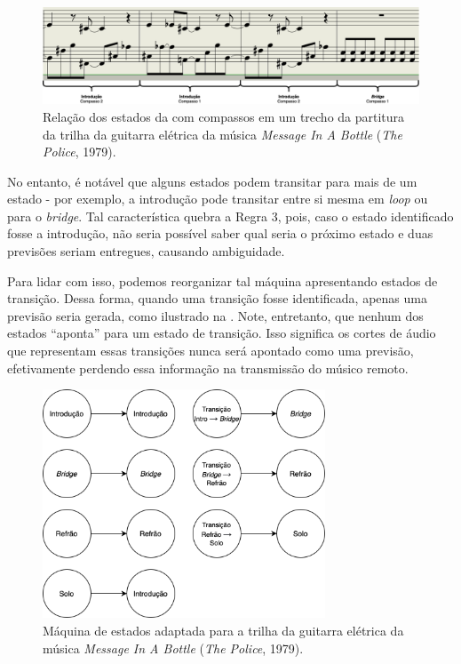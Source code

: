 \begin{figure}[htbp]
    \centering
    \includegraphics[width=1\textwidth]{images/dtw-real division.png}
    \caption{Relação dos estados da  com compassos em um trecho da partitura da trilha da guitarra elétrica da música \textit{Message In A Bottle} (\textit{The Police}, 1979).}
    \label{fig:miab_sheet_music}
\end{figure}

No entanto, é notável que alguns estados podem transitar para mais de um estado - por exemplo, a introdução pode transitar entre si mesma em \textit{loop} ou para o \textit{bridge}. Tal característica quebra a Regra 3, pois, caso o estado identificado fosse a introdução, não seria possível saber qual seria o próximo estado e duas previsões seriam entregues, causando ambiguidade.

Para lidar com isso, podemos reorganizar tal máquina apresentando estados de transição. Dessa forma, quando uma transição fosse identificada, apenas uma previsão seria gerada, como ilustrado na . Note, entretanto, que nenhum dos estados ``aponta'' para um estado de transição. Isso significa os cortes de áudio que representam essas transições nunca será apontado como uma previsão, efetivamente perdendo essa informação na transmissão do músico remoto.

\begin{figure}[htbp]
    \centering
    \includegraphics[width=0.75\textwidth]{images/MIAB adapted state machine.png}
    \caption{Máquina de estados adaptada para a trilha da guitarra elétrica da música \textit{Message In A Bottle} (\textit{The Police}, 1979).}
    \label{fig:miab_adapted_state_machine}
\end{figure}

